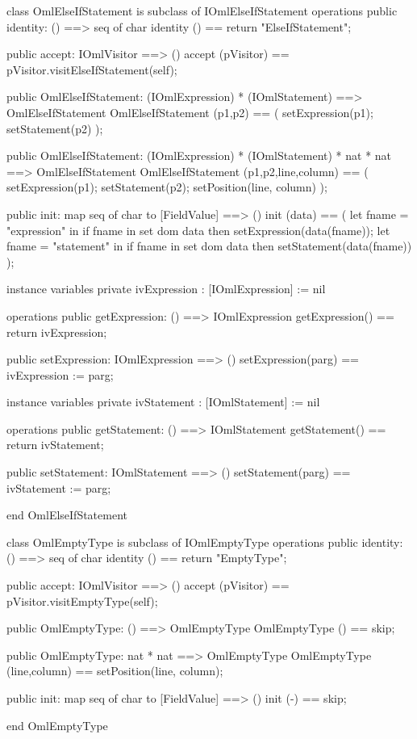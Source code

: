\begin{vdm_al}
class OmlElseIfStatement is subclass of IOmlElseIfStatement
operations
  public identity: () ==> seq of char
  identity () == return "ElseIfStatement";

  public accept: IOmlVisitor ==> ()
  accept (pVisitor) == pVisitor.visitElseIfStatement(self);

  public OmlElseIfStatement:
    (IOmlExpression) *
    (IOmlStatement) ==> OmlElseIfStatement
  OmlElseIfStatement (p1,p2) == 
    ( setExpression(p1);
      setStatement(p2) );

  public OmlElseIfStatement:
    (IOmlExpression) *
    (IOmlStatement) *
    nat *
    nat ==> OmlElseIfStatement
  OmlElseIfStatement (p1,p2,line,column) == 
    ( setExpression(p1);
      setStatement(p2);
      setPosition(line, column) );

  public init: map seq of char to [FieldValue] ==> ()
  init (data) ==
    ( let fname = "expression" in
        if fname in set dom data
        then setExpression(data(fname));
      let fname = "statement" in
        if fname in set dom data
        then setStatement(data(fname)) );

instance variables
  private ivExpression : [IOmlExpression] := nil

operations
  public getExpression: () ==> IOmlExpression
  getExpression() == return ivExpression;

  public setExpression: IOmlExpression ==> ()
  setExpression(parg) == ivExpression := parg;

instance variables
  private ivStatement : [IOmlStatement] := nil

operations
  public getStatement: () ==> IOmlStatement
  getStatement() == return ivStatement;

  public setStatement: IOmlStatement ==> ()
  setStatement(parg) == ivStatement := parg;

end OmlElseIfStatement
\end{vdm_al}

\begin{vdm_al}
class OmlEmptyType is subclass of IOmlEmptyType
operations
  public identity: () ==> seq of char
  identity () == return "EmptyType";

  public accept: IOmlVisitor ==> ()
  accept (pVisitor) == pVisitor.visitEmptyType(self);

  public OmlEmptyType:
    () ==> OmlEmptyType
  OmlEmptyType () == 
    skip;

  public OmlEmptyType:
    nat *
    nat ==> OmlEmptyType
  OmlEmptyType (line,column) == 
    setPosition(line, column);

  public init: map seq of char to [FieldValue] ==> ()
  init (-) == skip;

end OmlEmptyType
\end{vdm_al}

